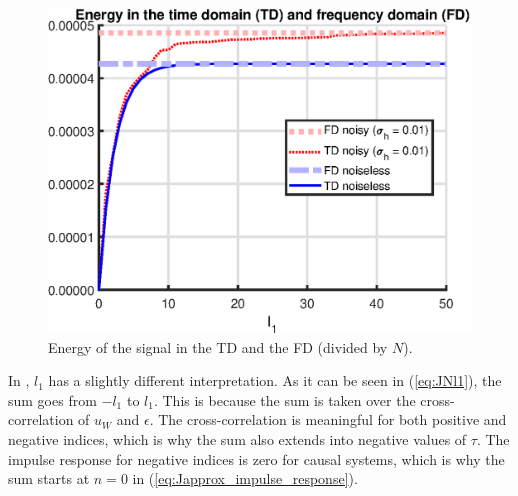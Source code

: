 \begin{figure}[H]
    \centering
    \includegraphics[width = 0.65 \textwidth]{figures/parseval_energy.eps}
    \caption{Energy of the signal in the TD and the FD (divided by $N$).}
    \label{fig:parseval_energy}
\end{figure}

In \cite{Data-driven_model_reference_control}, $l_1$ has a slightly different interpretation. As it can be seen in (\ref{eq:JNl1}), the sum goes from $-l_1$ to $l_1$. This is because the sum is taken over the cross-correlation of $u_W$ and $\epsilon$. The cross-correlation is meaningful for both positive and negative indices, which is why the sum also extends into negative values of $\tau$. The impulse response for negative indices is zero for causal systems, which is why the sum starts at $n = 0$ in (\ref{eq:Japprox_impulse_response}).

\newpage
